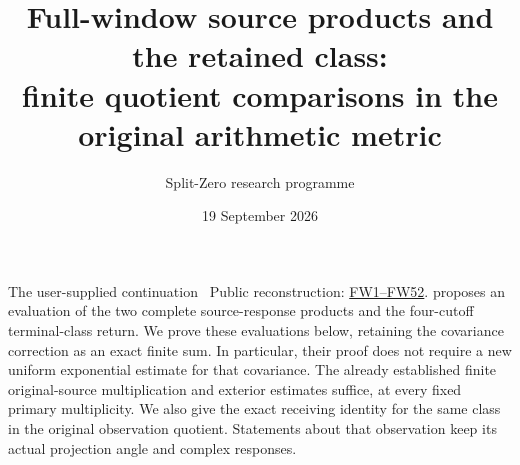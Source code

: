 \documentclass[11pt]{article}
\title{Full-window source products and the retained class:\\finite quotient comparisons in the original arithmetic metric}
\author{Split-Zero research programme}
\date{19 September 2026}
\begin{document}
\maketitle

The user-supplied continuation \cite{incoming}%
~Public reconstruction: \href{https://github.com/KokunoYumeto/zeta-function-research-reader/blob/689a8f87e9c12b7a99b01b3123438c6751ee608f/workbenches/splitzero-tandem/continuations/20260919-full-window-source-products/FULL_WINDOW_SOURCE_PRODUCTS.tex\#L28}{FW1--FW52}.%
{} proposes an evaluation of the
two complete source-response products and the four-cutoff terminal-class
return. We prove these evaluations below, retaining the covariance correction
as an exact finite sum. In particular, their proof does not require a new
uniform exponential estimate for that covariance. The already established
finite original-source multiplication and exterior estimates suffice, at
every fixed primary multiplicity. We also give the exact receiving identity
for the same class in the original observation quotient. Statements about
that observation keep its actual projection angle and complex responses.
\end{document}
